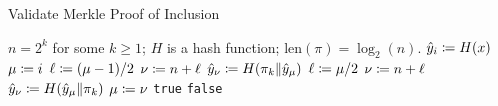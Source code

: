 \begin{algorithm}[p]
\caption{Validate Merkle Proof of Inclusion}
\label{alg:merkle_proof}
\begin{algorithmic}[1]
\Require $n = 2^{k}$ for some $k\ge1$; $H$ is a \gls{hash function}; $\text{len}(\pi) = \log_{2}(n)$.
    \State $\hat{y}_{i} \coloneqq{} H(x)$
    \State $\mu \coloneqq{} i$
            \State $\ell \coloneqq{} (\mu-1)/2$
            \State $\nu \coloneqq{} n + \ell$
            \State $\hat{y}_{\nu} \coloneqq{} H(\pi_{k}\|\hat{y}_{\mu})$
        \Else
            \State $\ell \coloneqq{} \mu/2$
            \State $\nu \coloneqq{} n + \ell$
            \State $\hat{y}_{\nu} \coloneqq{} H(\hat{y}_{\mu}\|\pi_{k})$
        \EndIf
        \State $\mu \coloneqq{} \nu$
    \EndFor
        \State \Return \texttt{true}
    \Else
        \State \Return \texttt{false}
    \EndIf
\EndProcedure
\end{algorithmic}
\end{algorithm}
